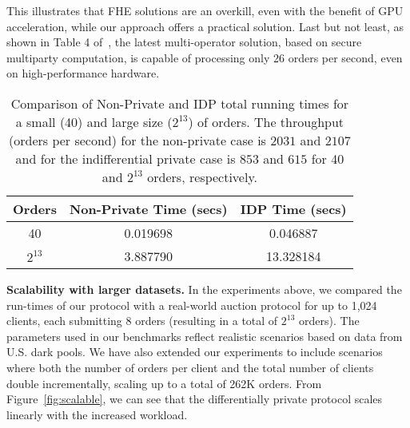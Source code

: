 This illustrates that FHE solutions are an overkill, even with the benefit of GPU acceleration, while our approach offers a practical solution. Last but not least, as shown in Table 4 of~\cite{MazloomDPB23}, the latest multi-operator solution, based on secure multiparty computation, is capable of processing only 26 orders per second, even on high-performance hardware. 

\begin{table}[hbt!]
    \centering
    \begin{tabular}{|c|c|c|}
        \hline
        \textbf{Orders} & \textbf{Non-Private Time (secs)} & \textbf{IDP Time (secs)} \\
        \hline
        40             & 0.019698                        & 0.046887                 \\
        \(2^{13}\)     & 3.887790                        & 13.328184                \\
        \hline
    \end{tabular}
    \caption{Comparison of Non-Private and IDP total running times for a small (40) and large size ($2^{13}$) of orders. The throughput (orders per second) for the non-private case is $2031$ and $2107$ and for the indifferential private case is $853$ and $615$ for 40 and $2^{13}$ orders, respectively.}
    \label{tab:comparison}
\end{table}

\noindent \textbf{Scalability with larger datasets.}
In the  experiments above, we compared the run-times of our protocol with a real-world auction protocol for up to 1,024 clients, each submitting 8 orders (resulting in a total of $2^{13}$ orders). The parameters used in our benchmarks reflect realistic scenarios based on data from U.S. dark pools. We have also extended our experiments to include scenarios where both the number of orders per client and the total number of clients double incrementally, scaling up to a total of 262K orders. From Figure~\ref{fig:scalable}, we can see that the differentially private protocol scales linearly with the increased workload. 

